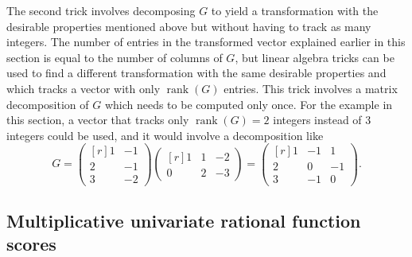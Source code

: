 \documentclass{article}
\DeclareMathOperator{\rank}{rank}
\begin{document}
The second trick involves decomposing $G$
to yield a transformation with the desirable
properties mentioned above but without having to track as many integers.
The number of entries in the transformed vector explained earlier
in this section is equal to the number of columns of $G$,
but linear algebra tricks can be used to find a different
transformation with the same desirable properties and which
tracks a vector with only $\rank{(G)}$ entries.
This trick involves a matrix decomposition of $G$ which
needs to be computed only once.
For the example in this section,
a vector that tracks only $\rank{(G)} = 2$ integers instead of 3 integers
could be used, and it would involve a decomposition like
\begin{equation*}
G =
\begin{pmatrix*}[r]
1 & -1 \\
2 & -1 \\
3 & -2
\end{pmatrix*}
\begin{pmatrix*}[r]
1 & 1 & -2 \\
0 & 2 & -3
\end{pmatrix*}
=
\begin{pmatrix*}[r]
1 & -1 & 1 \\
2 & 0 & -1 \\
3 & -1 & 0
\end{pmatrix*}.
\end{equation*}


\subsection*{Multiplicative univariate rational function scores}
\end{document}
